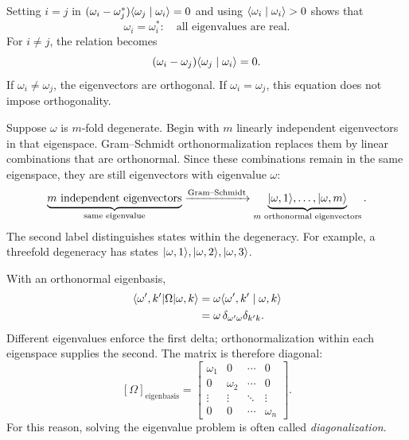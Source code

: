 Setting $i=j$ in
$(\omega_i-\omega_j^*)\langle \omega_j\mid \omega_i\rangle=0$ and using
$\langle \omega_i\mid \omega_i\rangle>0$ shows that
\[
 \omega_i=\omega_i^*:
 \quad\text{all eigenvalues are real.}
\]
For $i\ne j$, the relation becomes
\[
 (\omega_i-\omega_j)\langle \omega_j\mid \omega_i\rangle=0.
\]
If $\omega_i\ne\omega_j$, the eigenvectors are orthogonal.
If $\omega_i=\omega_j$, this equation does not impose orthogonality.

Suppose $\omega$ is $m$-fold degenerate. Begin with $m$ linearly
independent eigenvectors in that eigenspace. Gram--Schmidt
orthonormalization replaces them by linear combinations that are
orthonormal. Since these combinations remain in the same eigenspace,
they are still eigenvectors with eigenvalue $\omega$:
\[
 \underbrace{\text{$m$ independent eigenvectors}}_{\text{same eigenvalue}}
 \xrightarrow{\text{Gram--Schmidt}}
 \underbrace{\lvert \omega,1\rangle,\ldots,\lvert \omega,m\rangle}_{\text{$m$ orthonormal eigenvectors}}.
\]
The second label distinguishes states within the degeneracy. For
example, a threefold degeneracy has states
$\lvert \omega,1\rangle,\lvert \omega,2\rangle,\lvert \omega,3\rangle$.

With an orthonormal eigenbasis,
\begin{align*}
 \langle \omega',k'\rvert \Omega\lvert \omega,k\rangle
 &=\omega\langle \omega',k'\mid \omega,k\rangle\\
 &=\omega\,\delta_{\omega'\omega}\delta_{k'k}.
\end{align*}
Different eigenvalues enforce the first delta; orthonormalization
within each eigenspace supplies the second. The matrix is therefore
diagonal:
\[
 [\Omega]_{\mathrm{eigenbasis}}=
 \begin{bmatrix}
 \omega_1&0&\cdots&0\\
 0&\omega_2&\cdots&0\\
 \vdots&\vdots&\ddots&\vdots\\
 0&0&\cdots&\omega_n
 \end{bmatrix}.
\]
For this reason, solving the eigenvalue problem is often called
\emph{diagonalization}.
